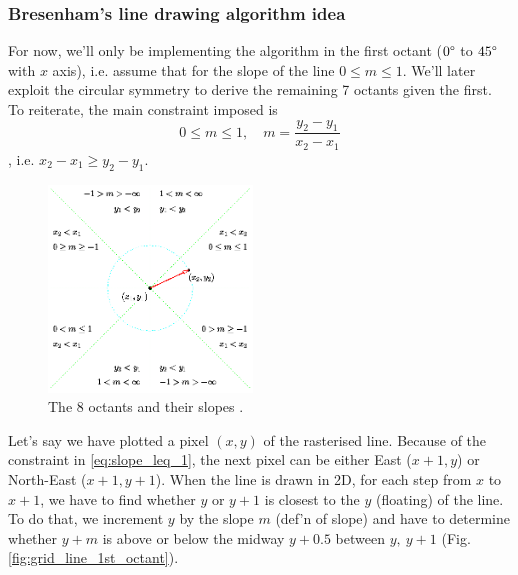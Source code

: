 \documentclass[a4paper]{article}
\begin{document}
\subsubsection{Bresenham's line drawing algorithm idea}
For now, we'll only be implementing the algorithm in the first octant ($0\degree$ to $45\degree$ with $x$ axis), i.e. assume that for the slope of the line $0 \leq m \leq 1$. We'll later exploit the circular symmetry to derive the remaining 7 octants given the first. To reiterate, the main constraint imposed is
\begin{equation}
	0 \leq m \leq 1,\quad m = \frac{y_2-y_1}{x_2-x_1} 
	\label{eq:slope_leq_1}
\end{equation}
, i.e. $x_2 - x_1 \geq y_2 - y_1$.
\begin{figure}[H]
	\centering
	\includegraphics[height=5.5cm]{img/octants.png}
	\caption{The 8 octants and their slopes \cite{mallinus}.}
	\label{fig:octants}
\end{figure}

Let's say we have plotted a pixel $(x,y)$ of the rasterised line. Because of the constraint in \eqref{eq:slope_leq_1}, the next pixel can be either East ($x+1,y$) or North-East ($x+1,y+1$). When the line is drawn in 2D, for each step from $x$ to $x+1$, we have to find whether $y$ or $y+1$ is closest to the $y$ (floating) of the line. To do that, we increment $y$ by the slope $m$ (def'n of slope) and have to determine whether $y+m$ is above or below the midway $y+0.5$  between $y, \ y+1$ (Fig. \ref{fig:grid_line_1st_octant}).
\end{document}

